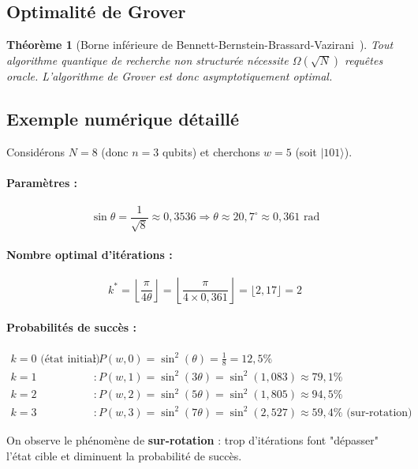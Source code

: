 \documentclass[12pt,a4paper]{article}
\newtheorem{theorem}{Théorème}[section]
\theoremstyle{definition}
\theoremstyle{remark}
\begin{document}
\subsection{Optimalité de Grover}

\begin{theorem}[Borne inférieure de Bennett-Bernstein-Brassard-Vazirani~\cite{bennett1997}]
Tout algorithme quantique de recherche non structurée nécessite $\Omega(\sqrt{N})$ requêtes oracle. L'algorithme de Grover est donc asymptotiquement optimal.
\end{theorem}

\subsection{Exemple numérique détaillé}

Considérons $N = 8$ (donc $n = 3$ qubits) et cherchons $w = 5$ (soit $|101\rangle$).

\paragraph{Paramètres :}
\[
\sin\theta = \frac{1}{\sqrt{8}} \approx 0{,}3536 \Rightarrow \theta \approx 20{,}7^\circ \approx 0{,}361 \text{ rad}
\]

\paragraph{Nombre optimal d'itérations :}
\[
k^* = \left\lfloor \frac{\pi}{4\theta} \right\rfloor = \left\lfloor \frac{\pi}{4 \times 0{,}361} \right\rfloor = \lfloor 2{,}17 \rfloor = 2
\]

\paragraph{Probabilités de succès :}
\begin{align*}
k = 0 \text{ (état initial)} &: P(w, 0) = \sin^2(\theta) = \frac{1}{8} = 12{,}5\% \\
k = 1 &: P(w, 1) = \sin^2(3\theta) = \sin^2(1{,}083) \approx 79{,}1\% \\
k = 2 &: P(w, 2) = \sin^2(5\theta) = \sin^2(1{,}805) \approx 94{,}5\% \\
k = 3 &: P(w, 3) = \sin^2(7\theta) = \sin^2(2{,}527) \approx 59{,}4\% \text{ (sur-rotation)}
\end{align*}

On observe le phénomène de \textbf{sur-rotation} : trop d'itérations font "dépasser" l'état cible et diminuent la probabilité de succès.
\end{document}
